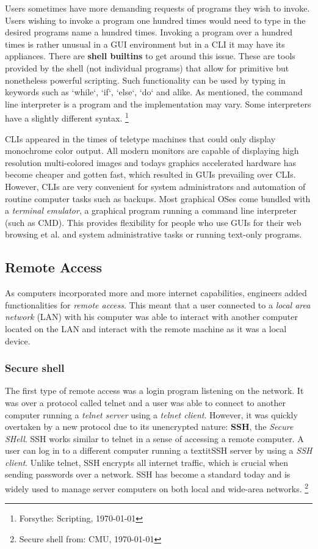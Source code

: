 Users sometimes have more demanding requests of programs they wish to invoke. Users wishing to invoke a
program one hundred times would need to type in the desired programs name a hundred times. Invoking
a program over a hundred times is rather unusual in a GUI environment but in a CLI it may have its
appliances. There are \textbf{shell builtins} to get around this issue. These are tools provided by the shell
(not individual programs) that allow for primitive but nonetheless powerful scripting. Such functionality
can be used by typing in keywords such as `while`, `if`, `else`, `do` and alike. As mentioned,
the command line interpreter is a program and the implementation may vary. Some interpreters have a
slightly different syntax. \footnote{Forsythe: Scripting, \today }



CLIs appeared in the times of teletype machines that could only display monochrome color output. All
modern monitors are capable of displaying high resolution multi-colored images and todays graphics
accelerated hardware has become cheaper and gotten fast, which resulted in GUIs prevailing over
CLIs. However, CLIs are very convenient for system administrators and automation of routine computer
tasks such as backups. Most graphical OSes come bundled with a \textit{terminal emulator}, a graphical program
running a command line interpreter (such as CMD). This provides flexibility for people who use GUIs for their web
browsing et al. and system administrative tasks or running text-only programs.


\subsection{Remote Access}

As computers incorporated more and more internet capabilities, engineers added functionalities for
\textit{remote access}. This meant that a user connected to a \textit{local area network} (LAN) with his computer
was able to interact with another computer located on the LAN and interact with the remote machine
as it was a local device. 

\subsubsection{Secure shell}

The first type of remote access was a login program listening on the network. It was over a protocol called
telnet and a user was able to connect to another computer running a \textit{telnet server} using a \textit{telnet client}.
However, it was quickly overtaken by a new protocol due to its unencrypted nature: \textbf{SSH}, the \textit{Secure SHell}.
SSH works similar to telnet in a sense of accessing a remote computer. A user can log in to a different
computer running a textit{SSH server} by using a \textit{SSH client}. Unlike telnet, SSH encrypts all internet traffic,
which is crucial when sending passwords over a network. SSH has become a standard today and is widely used to
manage server computers on both local and wide-area networks. \footnote{Secure shell from: CMU, \today}

